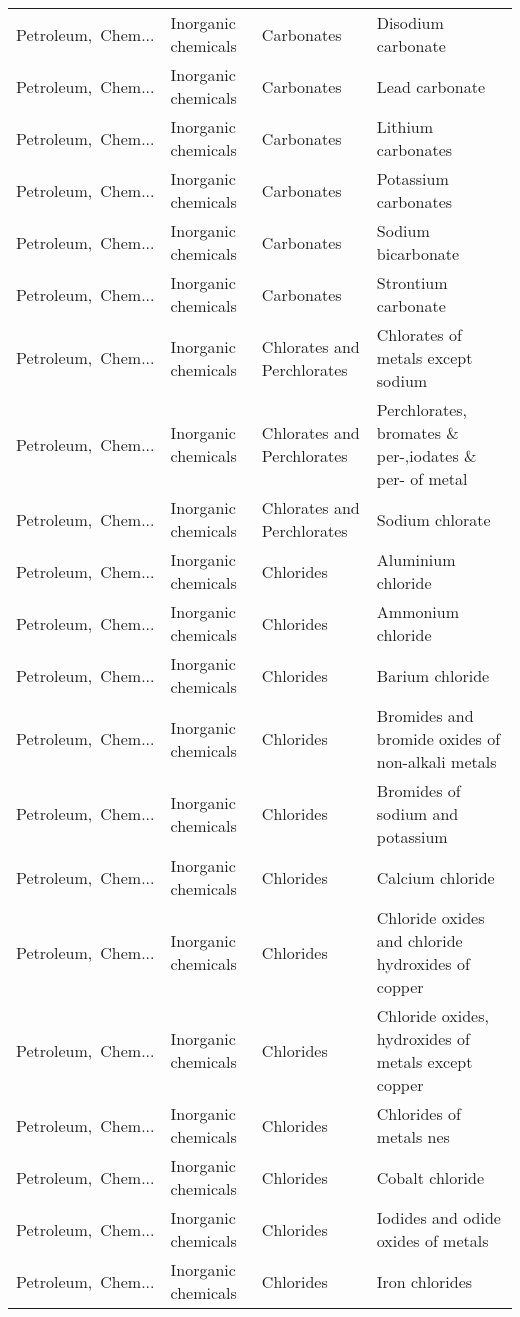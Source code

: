 \begin{appendices}
\begin{xltabular}{\textwidth}{|p{0.10\textwidth}|p{0.25\textwidth}|p{0.24\textwidth}|p{0.31\textwidth}|}
Petroleum,\ Chem... & Inorganic chemicals & Carbonates & Disodium carbonate \\
Petroleum,\ Chem... & Inorganic chemicals & Carbonates & Lead carbonate \\
Petroleum,\ Chem... & Inorganic chemicals & Carbonates & Lithium carbonates \\
Petroleum,\ Chem... & Inorganic chemicals & Carbonates & Potassium carbonates \\
Petroleum,\ Chem... & Inorganic chemicals & Carbonates & Sodium bicarbonate \\
Petroleum,\ Chem... & Inorganic chemicals & Carbonates & Strontium carbonate \\
Petroleum,\ Chem... & Inorganic chemicals & Chlorates and Perchlorates & Chlorates of metals except sodium \\
Petroleum,\ Chem... & Inorganic chemicals & Chlorates and Perchlorates & Perchlorates, bromates \& per-,iodates \& per- of metal \\
Petroleum,\ Chem... & Inorganic chemicals & Chlorates and Perchlorates & Sodium chlorate \\
Petroleum,\ Chem... & Inorganic chemicals & Chlorides & Aluminium chloride \\
Petroleum,\ Chem... & Inorganic chemicals & Chlorides & Ammonium chloride \\
Petroleum,\ Chem... & Inorganic chemicals & Chlorides & Barium chloride \\
Petroleum,\ Chem... & Inorganic chemicals & Chlorides & Bromides and bromide oxides of non-alkali metals \\
Petroleum,\ Chem... & Inorganic chemicals & Chlorides & Bromides of sodium and potassium \\
Petroleum,\ Chem... & Inorganic chemicals & Chlorides & Calcium chloride \\
Petroleum,\ Chem... & Inorganic chemicals & Chlorides & Chloride oxides and chloride hydroxides of copper \\
Petroleum,\ Chem... & Inorganic chemicals & Chlorides & Chloride oxides, hydroxides of metals except copper \\
Petroleum,\ Chem... & Inorganic chemicals & Chlorides & Chlorides of metals nes \\
Petroleum,\ Chem... & Inorganic chemicals & Chlorides & Cobalt chloride \\
Petroleum,\ Chem... & Inorganic chemicals & Chlorides & Iodides and odide oxides of metals \\
Petroleum,\ Chem... & Inorganic chemicals & Chlorides & Iron chlorides \\

\end{xltabular}
\end{appendices}
